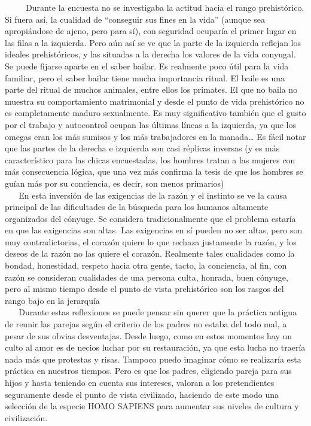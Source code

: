 ~ ~ ~ Durante la encuesta no se investigaba la actitud hacia el rango
prehistórico. Si fuera así, la cualidad de ``conseguir sus fines en la
vida'' (aunque sea apropiándose de ajeno, pero para sí), con seguridad
ocuparía el primer lugar en las filas a la izquierda. Pero aún así se ve
que la parte de la izquierda reflejan los ideales prehistóricos, y las
situadas a la derecha los valores de la vida conyugal. Se puede fijarse
aparte en el saber bailar. Es realmente poco útil para la vida familiar,
pero el saber bailar tiene mucha importancia ritual. El baile es una
parte del ritual de muchos animales, entre ellos los primates. El que no
baila no muestra su comportamiento matrimonial y desde el punto de vida
prehistórico no es completamente maduro sexualmente. Es muy
significativo también que el gusto por el trabajo y autocontrol ocupan
las últimas líneas a la izquierda, ya que los omegas eran los más
sumisos y los más trabajadores en la manada\ldots{} Es fácil notar que
las partes de la derecha e izquierda son casi réplicas inversas (y es
más característico para las chicas encuestadas, los hombres tratan a las
mujeres con más consecuencia lógica, que una vez más confirma la tesis
de que los hombres se guían más por su conciencia, es decir, son menos
primarios)\\
\hspace*{0.333em} ~ ~ En esta inversión de las exigencias de la razón y
el instinto se ve la causa principal de las dificultades de la búsqueda
para los humanos altamente organizados del cónyuge. Se considera
tradicionalmente que el problema estaría en que las exigencias son
altas. Las exigencias en sí pueden no ser altas, pero son muy
contradictorias, el corazón quiere lo que rechaza justamente la razón, y
los deseos de la razón no las quiere el corazón. Realmente tales
cualidades como la bondad, honestidad, respeto hacia otra gente, tacto,
la conciencia, al fin, con razón se consideran cualidades de una persona
culta, honrada, buen cónyuge, pero al mismo tiempo desde el punto de
vista prehistórico son los rasgos del rango bajo en la jerarquía\\
\hspace*{0.333em} ~ ~ Durante estas reflexiones se puede pensar sin
querer que la práctica antigua de reunir las parejas según el criterio
de los padres no estaba del todo mal, a pesar de sus obvias desventajas.
Desde luego, como en estos momentos hay un culto al amor es de necios
luchar por su restauración, ya que esta lucha no traería nada más que
protestas y risas. Tampoco puedo imaginar cómo se realizaría esta
práctica en nuestros tiempos. Pero es que los padres, eligiendo pareja
para sus hijos y hasta teniendo en cuenta sus intereses, valoran a los
pretendientes seguramente desde el punto de vista civilizado, haciendo
de este modo una selección de la especie HOMO SAPIENS para aumentar sus
niveles de cultura y civilización.

